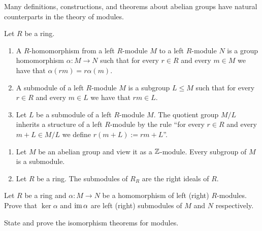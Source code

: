 \documentclass[11pt,a4paper]{article}
\begin{document}
\begin{remark}
  Many definitions, constructions, and theorems about abelian groups have
  natural counterparts in the theory of modules.
\end{remark}

\begin{definition}
  Let $R$ be a ring.
  \begin{enumerate}
    \item[(1)] A $R$-homomorphism from a left $R$-module $M$
      to a left $R$-module $N$ is a group homomorphism $\alpha \colon M \to N$
      such that for every $r \in R$ and every $m \in M$
      we have that $\alpha(rm) = r \alpha(m)$.
    \item[(2)] A submodule of a left $R$-module $M$ is a subgroup
      $L \leqslant M$ such that for every $r \in R$ and every $m \in L$
      we have that $rm \in L$.
    \item[(3)] Let $L$ be a submodule of a left $R$-module $M$.
      The quotient group $M/L$ inherits a structure of a left $R$-module
      by the rule ``for every $r \in R$ and every $m + L \in M/L$
      we define $r(m + L) := rm + L$''.
  \end{enumerate}
\end{definition}

\begin{example} \phantom{}
  \begin{enumerate}
    \item[(1)] Let $M$ be an abelian group and view it as a $\mathbb{Z}$-module.
      Every subgroup of $M$ is a submodule.
    \item[(2)] Let $R$ be a ring. The submodules of $R_R$ are the right ideals
      of $R$.
  \end{enumerate}
\end{example}

\begin{exercise}
  Let $R$ be a ring and $\alpha \colon M \to N$ be a homomorphism of left (right)
  $R$-modules.
  Prove that $\ker \alpha$ and $\operatorname{im} \alpha$ are left (right) submodules of $M$
  and $N$ respectively.
\end{exercise}

\begin{exercise}
  State and prove the isomorphism theorems for modules.
\end{exercise}
\end{document}
